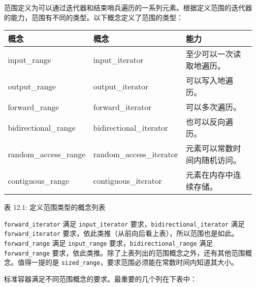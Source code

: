 范围定义为可以通过迭代器和结束哨兵遍历的一系列元素。根据定义范围的迭代器的能力，范围有不同的类型。以下概念定义了范围的类型：

\begin{longtable}{|l|l|l|}
\hline
\textbf{概念}     & \textbf{概念}  & \textbf{能力}                       \\ \hline
\endfirsthead
%
\endhead
%
input\_range         & input\_iterator         & 至少可以一次读取地遍历。  \\ \hline
output\_range        & output\_iterator        & 可以写入地遍历。                \\ \hline
forward\_range       & forward\_iterator       & 可以多次遍历。             \\ \hline
bidirectional\_range & bidirectional\_iterator & 也可以反向遍历。      \\ \hline
random\_access\_range & random\_access\_iterator & 元素可以常数时间内随机访问。 \\ \hline
contiguous\_range    & contiguous\_iterator    & 元素在内存中连续存储。 \\ \hline
\end{longtable}

\begin{center}
表 12.1: 定义范围类型的概念列表
\end{center}

\verb|forward_iterator| 满足 \verb|input_iterator| 要求，\verb|bidirectional_iterator| 满足 \verb|forward_iterator| 要求，依此类推（从前向后看上表），所以范围也是如此。\verb|forward_range| 满足 \verb|input_range| 要求，\verb|bidirectional_range| 满足 \verb|forward_range| 要求，依此类推。除了上表列出的范围概念之外，还有其他范围概念。值得一提的是 \verb|sized_range|，要求范围必须能在常数时间内知道其大小。

标准容器满足不同范围概念的要求。最重要的几个列在下表中：

